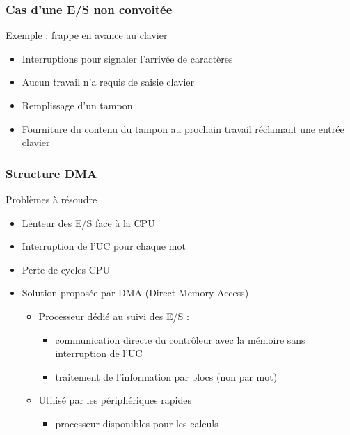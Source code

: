 \begin{frame}
\frametitle{Cas d’une E/S non convoitée}
\begin{exampleblock}{Exemple : frappe en avance au clavier}
\begin{itemize}
\item Interruptions pour signaler l’arrivée de caractères
\item Aucun travail n’a requis de saisie clavier
\item Remplissage d’un tampon
\item Fourniture du contenu du tampon au prochain travail réclamant une entrée clavier
\end{itemize}
\end{exampleblock}
\end{frame}


\begin{frame}
\frametitle{Structure DMA}
\begin{block}{Problèmes à résoudre}
\begin{itemize}
\item Lenteur des E/S face à la CPU
\item Interruption de l’UC pour chaque mot
\end{itemize}
\end{block}
\begin{itemize}
\item Perte de cycles CPU
\item Solution proposée par DMA (Direct Memory Access)
\begin{itemize}
\item Processeur dédié au suivi des E/S :
\begin{itemize}
\item communication directe du contrôleur avec la mémoire sans interruption de l’UC
\item traitement de l’information par blocs (non par mot)
\end{itemize}
\item Utilisé par les périphériques rapides
\begin{itemize}
\item processeur disponibles pour les calculs
\end{itemize}
\end{itemize}
\end{itemize}
\end{frame}


